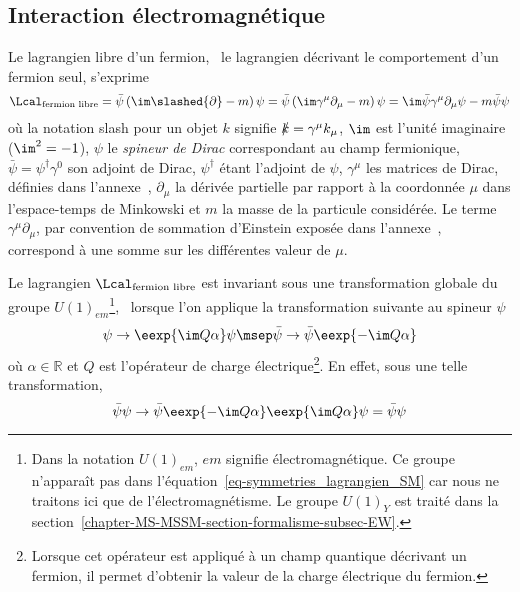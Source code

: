 \subsection{Interaction électromagnétique}\label{chapter-MS-MSSM-section-formalisme-subsec-QED}
Le lagrangien libre d'un fermion, \ie\ le lagrangien décrivant le comportement d'un fermion seul, s'exprime
\begin{equation}
\Lcal_{\text{fermion libre}}
= \bar{\psi} \left( \im\slashed{\partial} - m \right) \psi
= \bar{\psi} \left( \im \gamma^\mu\partial_\mu - m \right) \psi
= \im \bar{\psi} \gamma^\mu\partial_\mu \psi - m \bar{\psi}\psi
\label{eq-lagrangien_fermion_libre_partial}
\end{equation}
où la notation \og slash \fg{} pour un objet $k$ signifie $\slashed{k} = \gamma^\mu k_\mu$, $\im$ est l'unité imaginaire ($\im^2=-1$), $\psi$ le \emph{spineur de Dirac} correspondant au champ fermionique, $\bar{\psi}=\psi^\dagger\gamma^0$ son adjoint de Dirac, $\psi^\dagger$ étant l'adjoint de $\psi$, $\gamma^\mu$ les matrices de Dirac, définies dans l'annexe~, $\partial_\mu$ la dérivée partielle par rapport à la coordonnée $\mu$ dans l'espace-temps de Minkowski et $m$ la masse de la particule considérée.
Le terme $\gamma^\mu \partial_\mu$, par convention de sommation d'Einstein exposée dans l'annexe~, correspond à une somme sur les différentes valeur de $\mu$.
\par Le lagrangien $\Lcal_{\text{fermion libre}}$ est invariant sous une transformation globale du groupe $U(1)_{em}$\footnote{Dans la notation $U(1)_{em}$, \og $em$ \fg{} signifie électromagnétique. Ce groupe n'apparaît pas dans l'équation~\eqref{eq-symmetries_lagrangien_SM} car nous ne traitons ici que de l'électromagnétisme. Le groupe $U(1)_Y$ est traité dans la section~\ref{chapter-MS-MSSM-section-formalisme-subsec-EW}.}, \ie\ lorsque l'on applique la transformation suivante au spineur $\psi$
\begin{equation}
\psi \to \eexp{\im Q\alpha}\psi
\msep
\bar{\psi} \to \bar{\psi}\eexp{-\im Q\alpha}
\end{equation}
où $\alpha\in\mathbb{R}$ et $Q$ est l'opérateur de charge électrique\footnote{Lorsque cet opérateur est appliqué à un champ quantique décrivant un fermion, il permet d'obtenir la valeur de la charge électrique du fermion.}.
En effet, sous une telle transformation,
\begin{equation}
\bar{\psi}\psi \to \bar{\psi}\eexp{-\im Q\alpha}\eexp{\im Q\alpha}\psi = \bar{\psi}\psi
\end{equation}
